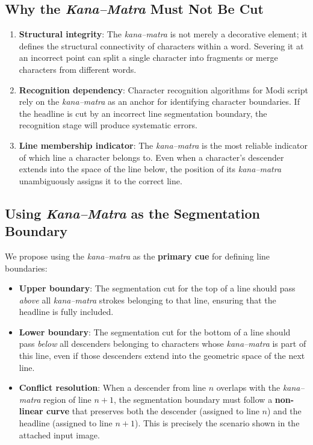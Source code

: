 \documentclass[11pt, a4paper]{article}
\begin{document}
\subsection{Why the \textit{Kana--Matra} Must Not Be Cut}

\begin{enumerate}[leftmargin=1.5em]
    \item \textbf{Structural integrity}: The \textit{kana--matra} is not merely a decorative element; it defines the structural connectivity of characters within a word. Severing it at an incorrect point can split a single character into fragments or merge characters from different words.
    
    \item \textbf{Recognition dependency}: Character recognition algorithms for Modi script rely on the \textit{kana--matra} as an anchor for identifying character boundaries. If the headline is cut by an incorrect line segmentation boundary, the recognition stage will produce systematic errors.
    
    \item \textbf{Line membership indicator}: The \textit{kana--matra} is the most reliable indicator of which line a character belongs to. Even when a character's descender extends into the space of the line below, the position of its \textit{kana--matra} unambiguously assigns it to the correct line.
\end{enumerate}

\subsection{Using \textit{Kana--Matra} as the Segmentation Boundary}

We propose using the \textit{kana--matra} as the \textbf{primary cue} for defining line boundaries:

\begin{itemize}[leftmargin=1.5em]
    \item \textbf{Upper boundary}: The segmentation cut for the top of a line should pass \textit{above} all \textit{kana--matra} strokes belonging to that line, ensuring that the headline is fully included.
    
    \item \textbf{Lower boundary}: The segmentation cut for the bottom of a line should pass \textit{below} all descenders belonging to characters whose \textit{kana--matra} is part of this line, even if those descenders extend into the geometric space of the next line.
    
    \item \textbf{Conflict resolution}: When a descender from line $n$ overlaps with the \textit{kana--matra} region of line $n+1$, the segmentation boundary must follow a \textbf{non-linear curve} that preserves both the descender (assigned to line $n$) and the headline (assigned to line $n+1$). This is precisely the scenario shown in the attached input image.
\end{itemize}
\end{document}
